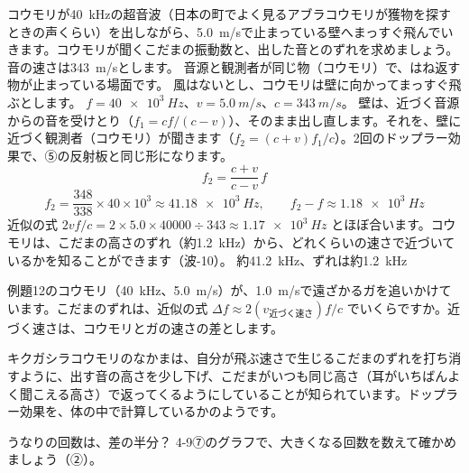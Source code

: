 \label{ph:波-8:ex12}
\begin{phreidai}[コウモリが聞くこだま]
コウモリが\qty{40}{kHz}の超音波（日本の町でよく見るアブラコウモリが獲物を探すときの声くらい）を出しながら、\qty{5.0}{m/s}で止まっている壁へまっすぐ飛んでいきます。コウモリが聞くこだまの振動数と、出した音とのずれを求めましょう。音の速さは\qty{343}{m/s}とします。
\phbamen
音源と観測者が同じ物（コウモリ）で、はね返す物が止まっている場面です。
\phmushi
風はないとし、コウモリは壁に向かってまっすぐ飛ぶとします。
\phzu
$f=\qty{40e3}{Hz}$、$v=\qty{5.0}{m/s}$、$c=\qty{343}{m/s}$。
\phriyu
壁は、近づく音源からの音を受けとり（$f_1=cf/(c-v)$）、そのまま出し直します。それを、壁に近づく観測者（コウモリ）が聞きます（$f_2=(c+v)f_1/c$）。2回のドップラー効果で、⑤の反射板と同じ形になります。
\phtateru
\[f_2=\frac{c+v}{c-v}\,f\]
\phtoku
\[f_2=\frac{348}{338}\times40\times10^3\approx\qty{41.18e3}{Hz},\qquad f_2-f\approx\qty{1.18e3}{Hz}\]
\phtashikame
近似の式 $2vf/c=2\times5.0\times\num{40000}\div343\approx\qty{1.17e3}{Hz}$ とほぼ合います。コウモリは、こだまの高さのずれ（約\qty{1.2}{kHz}）から、どれくらいの速さで近づいているかを知ることができます（波-10）。
\kotae 約\qty{41.2}{kHz}、ずれは約\qty{1.2}{kHz}
\end{phreidai}
\begin{jibun}
例題12のコウモリ（\qty{40}{kHz}、\qty{5.0}{m/s}）が、\qty{1.0}{m/s}で遠ざかるガを追いかけています。こだまのずれは、近似の式 $\Delta f\approx2(v_{\text{近づく速さ}})f/c$ でいくらですか。近づく速さは、コウモリとガの速さの差とします。
\end{jibun}

\begin{phmijika}[ずれを打ち消すコウモリ]
キクガシラコウモリのなかまは、自分が飛ぶ速さで生じるこだまのずれを打ち消すように、出す音の高さを少し下げ、こだまがいつも同じ高さ（耳がいちばんよく聞こえる高さ）で返ってくるようにしていることが知られています。ドップラー効果を、体の中で計算しているかのようです。
\end{phmijika}

\begin{tsumazuki}{うなりの回数は、差の半分？}
4-9⑦のグラフで、大きくなる回数を数えて確かめましょう（②）。
\end{tsumazuki}

